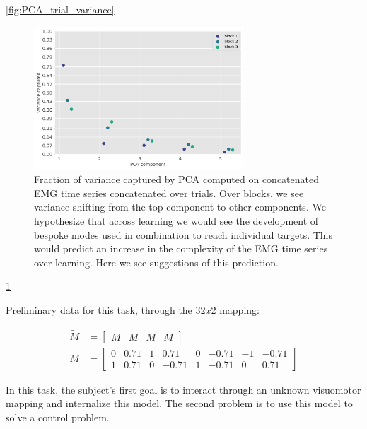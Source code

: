 \documentclass[
  a4paper,
]{article}
\begin{document}
\cref{fig:PCA_trial_variance}

\begin{figure}
\hypertarget{fig:PCA_concat_variance}{%
\centering
\includegraphics[width=0.7\textwidth,height=\textheight]{images/data_analysis/center_hold/PCA_concat_variance.pdf}
\caption{Fraction of variance captured by PCA computed on concatenated
EMG time series concatenated over trials. Over blocks, we see variance
shifting from the top component to other components. We hypothesize that
across learning we would see the development of bespoke modes used in
combination to reach individual targets. This would predict an increase
in the complexity of the EMG time series over learning. Here we see
suggestions of this prediction.}\label{fig:PCA_concat_variance}
}
\end{figure}

\cref{fig:PCA_concat_variance}

Preliminary data for this task, through the \(32x2\) mapping:

\begin{align*}
\tilde{M} &= \begin{bmatrix}M & M & M & M\end{bmatrix} \\
M &=
\begin{bmatrix}
0  & 0.71  & 1   & 0.71   & 0  & -0.71  & -1  & -0.71 \\
1  & 0.71  & 0  & -0.71  & 1   & -0.71   & 0   & 0.71
\end{bmatrix}
\end{align*}

In this task, the subject's first goal is to interact through an unknown
visuomotor mapping and internalize this model. The second problem is to
use this model to solve a control problem.
\end{document}
